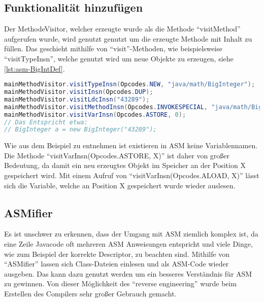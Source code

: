 \subsection{Funktionalität hinzufügen} \label{subsec:asm-insn}

Der MethodeVisitor, welcher erzeugte wurde als die Methode \enquote{visitMethod} aufgerufen wurde, wird genutzt genutzt um die erzeugte Methode mit Inhalt zu füllen. Das geschieht mithilfe von \enquote{visit}-Methoden, wie beispielsweise \enquote{visitTypeInsn}, welche genutzt wird um neue Objekte zu erzeugen, siehe \cref{lst:asm-BigIntDef}.

\begin{lstlisting}[language=Java, caption=Erzeugen eines BigIntegers mit ASM, label={lst:asm-BigIntDef}]
mainMethodVisitor.visitTypeInsn(Opcodes.NEW, "java/math/BigInteger");
mainMethodVisitor.visitInsn(Opcodes.DUP);
mainMethodVisitor.visitLdcInsn("43289");
mainMethodVisitor.visitMethodInsn(Opcodes.INVOKESPECIAL, "java/math/BigInteger", "<init>", "(Ljava/lang/String;)V", false);
mainMethodVisitor.visitVarInsn(Opcodes.ASTORE, 0);
// Das Entspricht etwa:
// BigInteger a = new BigInteger("43289");
\end{lstlisting}

Wie aus dem Beispiel zu entnehmen ist existieren in ASM keine Variablennamen. Die Methode \enquote{visitVarInsn(Opcodes.ASTORE, X)} ist daher von großer Bedeutung, da damit ein neu erzeugtes Objekt im Speicher an der Position X gespeichert wird. Mit einem Aufruf von \enquote{visitVarInsn(Opcodes.ALOAD, X)} lässt sich die Variable, welche an Position X gespeichert wurde wieder auslesen.

\subsection{ASMifier} \label{subsec:asmifer}
Es ist unschwer zu erkennen, dass der Umgang mit ASM ziemlich komplex ist, da eine Zeile Javacode oft mehreren ASM Anweisungen entspricht und viele Dinge, wie zum Beispiel der korrekte Descriptor, zu beachten sind. Mithilfe von \enquote{ASMifier} lassen sich Class-Dateien einlesen und als ASM-Code wieder ausgeben. Das kann dazu genutzt werden um ein besseres Verständnis für ASM zu gewinnen. Von dieser Möglichkeit des \enquote{reverse engineering} wurde beim Erstellen des Compilers sehr großer Gebrauch gemacht.
